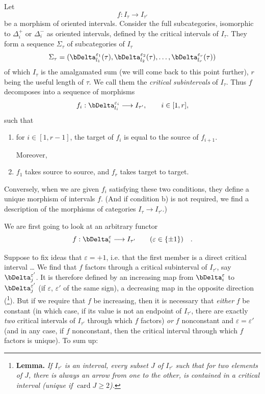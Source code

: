 Let
\[
f : I_\tau\longrightarrow I_{\tau'}
\]
be a morphism of oriented intervals. Consider the full subcategories, isomorphic to $\Delta_i^+$ or $\Delta_i^-$ as oriented intervals, defined by the critical intervals of $I_\tau$. They form a sequence $\Sigma_\tau$ of subcategories of $I_\tau$
\[
\Sigma_\tau=(\bDelta^{\varepsilon_1}_{l_1}(\tau),\bDelta^{\varepsilon_2}_{l_2}(\tau),\ldots,\bDelta^{\varepsilon_r}_{l_r}(\tau))
\]
of which $I_\tau$ is the amalgamated sum (we will come back to this point further), $r$ being the useful length of $\tau$. We call them the \textit{critical subintervals} of $I_\tau$. Thus $f$ decomposes into a sequence of morphisms
\[
f_i : \bDelta^{\varepsilon_i}_{l_i}\longrightarrow I_{\tau'},\qquad i\in[1,r],
\]
such that
\begin{enumerate}
\item[a)] for $i\in[1,r-1]$, the target of $f_i$ is equal to the source of $f_{i+1}$.

Moreover,
\item[b)] $f_1$ takes source to source, and $f_r$ takes target to target.
\end{enumerate}

Conversely, when we are given $f_i$ satisfying these two conditions, they define a unique morphism of intervals $f$. (And if condition b) is not required, we find a description of the morphisms of categories $I_\tau\longrightarrow I_{\tau'}$.)

We are first going to look at an arbitrary functor
\[
f : \bDelta^{\varepsilon}_i\longrightarrow I_{\tau'}\qquad(\varepsilon\in\{\pm1\})\quad .
\]

Suppose to fix ideas that $\varepsilon=+1$, i.e. that the first member is a direct critical interval \ldots{} We find that $f$ factors through a critical subinterval of $I_{\tau'}$, say $\bDelta^{\varepsilon'}_j$. It is therefore defined by an increasing map from $\bDelta^{\varepsilon}_i$ to $\bDelta^{\varepsilon'}_j$ (if $\varepsilon$, $\varepsilon'$ of the same sign), a decreasing map in the opposite direction (\footnote[11]{\textbf{Lemma.} \textit{If $I_{\tau'}$ is an interval, every subset $J$ of $I_{\tau'}$ such that for two elements of $J$, there is always an arrow from one to the other, is contained in a critical interval (unique if} $\operatorname{card} J\geq 2$\textit{).}}). But if we require that $f$ be increasing, then it is necessary that \textit{either} $f$ be constant (in which case, if its value is not an endpoint of $I_{\tau'}$, there are exactly \textit{two} critical intervals of $I_{\tau'}$ through which $f$ factors) \textit{or} $f$ nonconstant and $\varepsilon=\varepsilon'$ (and in any case, if $f$ nonconstant, then the critical interval through which $f$ factors is unique). To sum up:

